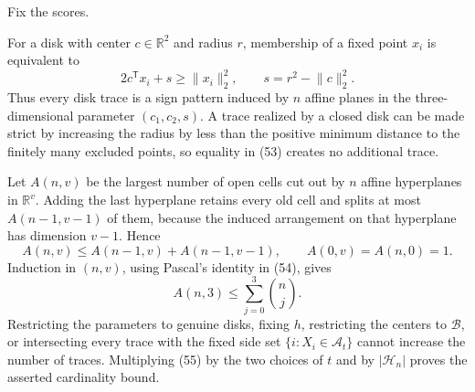 Fix the scores.

For a disk with center \(c\in\mathbb R^2\) and radius \(r\), membership of a fixed point \(x_i\) is equivalent to
\[
 2c^{\mathsf T}x_i+s\ge\lVert x_i\rVert_2^2,
 \qquad s=r^2-\lVert c\rVert_2^2. \tag{53}
\]
Thus every disk trace is a sign pattern induced by \(n\) affine planes in the three-dimensional parameter \((c_1,c_2,s)\). A trace realized by a closed disk can be made strict by increasing the radius by less than the positive minimum distance to the finitely many excluded points, so equality in (53) creates no additional trace.

Let \(A(n,v)\) be the largest number of open cells cut out by \(n\) affine hyperplanes in \(\mathbb R^v\). Adding the last hyperplane retains every old cell and splits at most \(A(n-1,v-1)\) of them, because the induced arrangement on that hyperplane has dimension \(v-1\). Hence
\[
 A(n,v)\le A(n-1,v)+A(n-1,v-1),
 \qquad A(0,v)=A(n,0)=1. \tag{54}
\]
Induction in \((n,v)\), using Pascal's identity in (54), gives
\[
 A(n,3)\le\sum_{j=0}^3\binom nj. \tag{55}
\]
Restricting the parameters to genuine disks, fixing \(h\), restricting the centers to \(\mathcal B\), or intersecting every trace with the fixed side set \(\{i:X_i\in\mathcal A_t\}\) cannot increase the number of traces. Multiplying (55) by the two choices of \(t\) and by \(|\mathcal H_n|\) proves the asserted cardinality bound.

